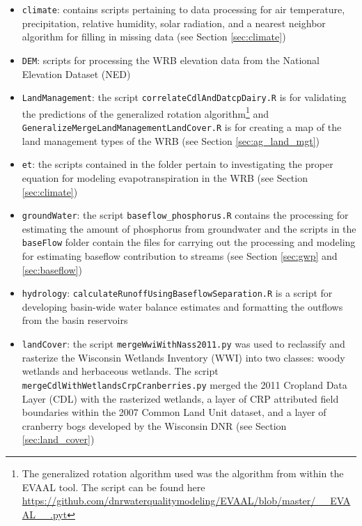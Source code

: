 \begin{itemize}
\item \texttt{climate}: contains scripts pertaining to data processing for air temperature, precipitation, relative humidity, solar radiation, and a nearest neighbor algorithm for filling in missing data (see Section \ref{sec:climate})

\item \texttt{DEM}: scripts for processing the WRB elevation data from the National Elevation Dataset (NED)

\item \texttt{LandManagement}: the script \texttt{correlateCdlAndDatcpDairy.R} is for validating the predictions of the generalized rotation algorithm\footnote{The generalized rotation algorithm used was the algorithm from within the EVAAL tool. The script can be found here \url{https://github.com/dnrwaterqualitymodeling/EVAAL/blob/master/__EVAAL__.pyt}} and \texttt{GeneralizeMergeLandManagementLandCover.R} is for creating a map of the land management types of the WRB (see Section \ref{sec:ag_land_mgt})

\item \texttt{et}: the scripts contained in the folder pertain to investigating the proper equation for modeling evapotranspiration in the WRB (see Section \ref{sec:climate})

\item \texttt{groundWater}: the script \texttt{baseflow\_phosphorus.R} contains the processing for estimating the amount of phosphorus from groundwater and the scripts in the \texttt{baseFlow} folder contain the files for carrying out the processing and modeling for estimating baseflow contribution to streams (see Section \ref{sec:gwp} and \ref{sec:baseflow})

\item \texttt{hydrology}: \texttt{calculateRunoffUsingBaseflowSeparation.R} is a script for developing  basin-wide water balance estimates and formatting the outflows from the basin reservoirs

\item \texttt{landCover}: the script \texttt{mergeWwiWithNass2011.py} was used to reclassify and rasterize the Wisconsin Wetlands Inventory (WWI) into two classes: woody wetlands and herbaceous wetlands. The script \texttt{mergeCdlWithWetlandsCrpCranberries.py} merged the 2011 Cropland Data Layer (CDL) with the rasterized wetlands, a layer of CRP attributed field boundaries within the 2007 Common Land Unit dataset, and a layer of cranberry bogs developed by the Wisconsin DNR (see Section \ref{sec:land_cover})


\end{itemize}
